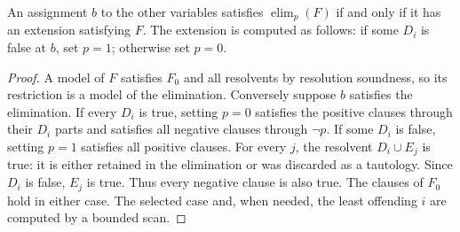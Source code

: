 \begin{lemma}
\label{ca-elimination}
An assignment $b$ to the other variables satisfies
$\operatorname{elim}_p(F)$ if and only if it has an extension satisfying $F$.
The extension is computed as follows: if some $D_i$ is false at $b$, set
$p=1$; otherwise set $p=0$.
\end{lemma}
\begin{proof}
A model of $F$ satisfies $F_0$ and all resolvents by resolution soundness, so
its restriction is a model of the elimination.  Conversely suppose $b$
satisfies the elimination.  If every $D_i$ is true, setting $p=0$ satisfies
the positive clauses through their $D_i$ parts and satisfies all negative
clauses through $\neg p$.  If some $D_i$ is false, setting $p=1$ satisfies
all positive clauses.  For every $j$, the resolvent $D_i\cup E_j$ is true:
it is either retained in the elimination or was discarded as a tautology.
Since $D_i$ is false, $E_j$ is true.  Thus every negative clause is also true.
The clauses of $F_0$ hold in either case.  The selected case and, when needed,
the least offending $i$ are computed by a bounded scan.
\end{proof}

